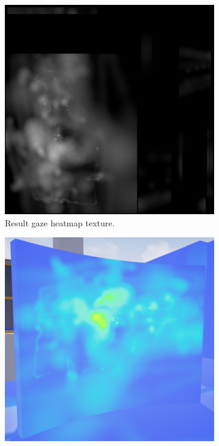 \begin{figure}[!ht]\centering
    \begin{subfigure}[b]{0.32\textwidth}
        \centering
        \includegraphics[width=\textwidth]{img/data/Panel14/resultant/Result.png}
        \caption{Result gaze heatmap texture.}
    \end{subfigure}
    \hfill
    \begin{subfigure}[b]{0.325\textwidth}
        \centering
        \includegraphics[width=\textwidth]{img/data/Panel14/resultant/heatmap.png}

\end{subfigure}
\end{figure}
